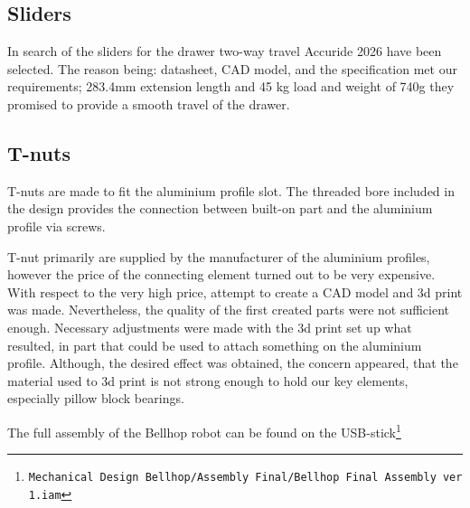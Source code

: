 \documentclass[11pt]{article}
\begin{document}
\subsection*{Sliders}
In search of the sliders for the drawer two-way travel Accuride 2026 have been selected. The reason being: datasheet, CAD model, and the specification met our requirements; 283.4mm extension length and 45 kg load and weight of 740g they promised to provide a smooth travel of the drawer.


\subsection*{T-nuts}
T-nuts are made to fit the aluminium profile slot. The threaded bore included in the design provides the connection between built-on part and the aluminium profile via screws.


T-nut primarily are supplied by the manufacturer of the aluminium profiles, however the price of the connecting element turned out to be very expensive. With respect to the very high price, attempt to create a CAD model and 3d print was made. Nevertheless, the quality of the first created parts were not sufficient enough. Necessary adjustments were made with the 3d print set up what resulted, in part that could be used to attach something on the aluminium profile. Although, the desired effect was obtained, the concern appeared, that the material used to 3d print is not strong enough to hold our key elements, especially pillow block bearings.

The full assembly of the Bellhop robot can be found on the USB-stick\footnote{\texttt{Mechanical Design Bellhop/Assembly Final/Bellhop Final Assembly ver 1.iam}}
\end{document}
